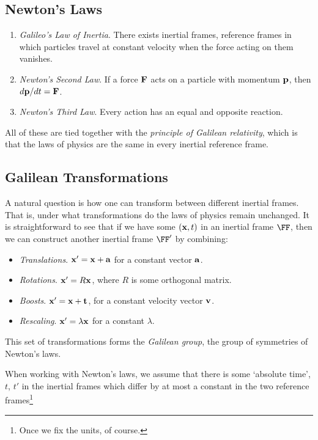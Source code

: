 \documentclass[a4paper]{scrartcl}
\begin{document}
\subsection{Newton's Laws}

\begin{enumerate}
	\item \emph{Galileo's Law of Inertia}. There exists inertial frames, reference frames in which particles travel at constant velocity when the force acting on them vanishes.
	\item \emph{Newton's Second Law}. If a force $\mathbf{F}$ acts on a particle with momentum $\mathbf{p}$, then $d\mathbf{p}/dt = \mathbf{F}$.
	\item \emph{Newton's Third Law}. Every action has an equal and opposite reaction.
\end{enumerate}

All of these are tied together with the \emph{principle of Galilean relativity}, which is that the laws of physics are the same in every inertial reference frame.

\subsection{Galilean Transformations}

A natural question is how one can transform between different inertial frames. That is, under what transformations do the laws of physics remain unchanged. It is straightforward to see that if we have some $(\mathbf{x}, t)$ in an inertial frame $\FF$, then we can construct another inertial frame $\FF'$ by combining:
\begin{itemize}
	\item \emph{Translations}. $\mathbf{x}' = \mathbf{x} + \mathbf{a}$ for a constant vector $\mathbf{a}$.
	\item \emph{Rotations}. $\mathbf{x}' = R \mathbf{x}$, where $R$ is some orthogonal matrix.
	\item \emph{Boosts}. $\mathbf{x}' = \mathbf{x} + \mathbf{t}$, for a constant velocity vector $\mathbf{v}$.
	\item \emph{Rescaling}. $\mathbf{x}' = \lambda \mathbf{x}$ for a constant $\lambda$. 
\end{itemize}
This set of transformations forms the \emph{Galilean group}, the group of symmetries of Newton's laws.

When working with Newton's laws, we assume that there is some `absolute time', $t$, $t'$ in the inertial frames which differ by at most a constant in the two reference frames\footnote{Once we fix the units, of course.}
\end{document}
